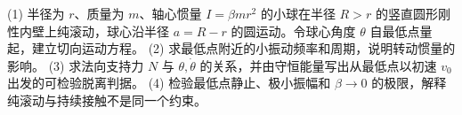 (1) 半径为 \(r\)、质量为 \(m\)、轴心惯量 \(I=\beta mr^2\) 的小球在半径 \(R>r\) 的竖直圆形刚性内壁上纯滚动，球心沿半径 \(a=R-r\) 的圆运动。令球心角度 \(\theta\) 自最低点量起，建立切向运动方程。
(2) 求最低点附近的小振动频率和周期，说明转动惯量的影响。
(3) 求法向支持力 \(N\) 与 \(\theta,\dot\theta\) 的关系，并由守恒能量写出从最低点以初速 \(v_0\) 出发的可检验脱离判据。
(4) 检验最低点静止、极小振幅和 \(\beta\to0\) 的极限，解释纯滚动与持续接触不是同一个约束。
